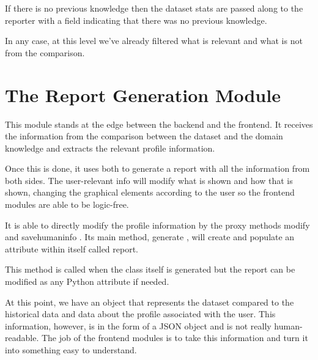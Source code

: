If there is no previous knowledge then the dataset stats are passed along to the reporter with a field indicating that there was no previous knowledge.

In any case, at this level we've already filtered what is relevant and what is not from the comparison.

\section{The Report Generation Module}
\label{cap2:sec:reporter}

This module stands at the edge between the backend and the frontend. It receives the information from the comparison between the dataset and the domain knowledge and extracts the relevant profile information.

Once this is done, it uses both to generate a report with all the information from both sides. The user-relevant info will modify what is shown and  how  that is shown, changing the graphical elements according to the user so the frontend modules are able to be logic-free.

It is able to directly modify the profile information by the proxy methods  modify  and  savehumaninfo . Its main method,  generate , will create and populate an attribute within itself called report.

This method is called when the class itself is generated but the report can be modified as any Python attribute if needed.

At this point, we have an object that represents the dataset compared to the historical data and data about the profile associated with the user. This information, however, is in the form of a JSON object and is not really human-readable. The job of the frontend modules is to take this information and turn it into something easy to understand.

